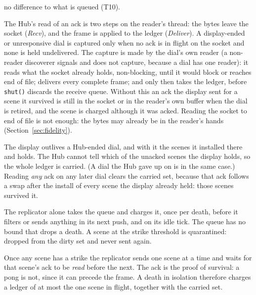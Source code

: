 \documentclass[a4paper,10pt,fleqn]{article}
\begin{document}
\begin{description}
    no difference to what is queued (T10).
  \item[The drain.]  The Hub's read of an ack is two steps on the reader's thread:
    the bytes leave the socket (\emph{Recv}), and the frame is applied to the
    ledger (\emph{Deliver}).  A display-ended or unresponsive dial is captured
    only when no ack is in flight on the socket and none is held undelivered.  The
    capture is made by the dial's own reader (a non-reader discoverer signals and
    does not capture, because a dial has one reader): it reads what the socket
    already holds, non-blocking, until it would block or reaches end of file;
    delivers every complete frame; and only then takes the ledger, before
    \texttt{shut()} discards the receive queue.  Without this an ack the display
    sent for a scene it survived is still in the socket or in the reader's own
    buffer when the dial is retired, and the scene is charged although it was
    acked.  Reading the socket to end of file is not enough: the bytes may already
    be in the reader's hands (Section~\ref{sec:fidelity}).
  \item[The carried set.]  The display outlives a Hub-ended dial, and with it the
    scenes it installed there and holds.  The Hub cannot tell which of the
    unacked scenes the display holds, so the whole ledger is carried.  (A dial the Hub gave up on is in the same
    case.)  Reading
    \emph{any} ack on any later dial clears the carried set, because that ack
    follows a swap after the install of every scene the display already held:
    those scenes survived it.
  \item[One charger, charging first.]  The replicator alone takes the queue and
    charges it, once per death, before it filters or sends anything in its next
    push, and on its idle tick.  The queue has no bound that drops a death.  A
    scene at the strike threshold is quarantined: dropped from the dirty set and
    never sent again.
  \item[Isolation, the ack as proof.]  Once any scene has a strike the replicator
    sends one scene at a time and waits for that scene's ack to be \emph{read}
    before the next.  The ack is the proof of survival: a pong is not, since it
    can precede the frame.  A death in isolation therefore charges a ledger of at
    most the one scene in flight, together with the carried set.
\end{description}
\end{document}
